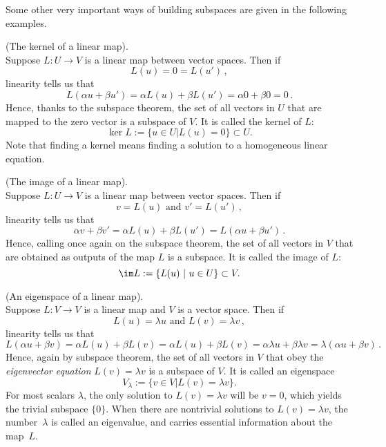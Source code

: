 Some other very important ways of building subspaces are given in the following examples.

\begin{example}
(The kernel of a linear map).\\[-2mm]

\noindent
Suppose $L:U\to V$ is a linear map between vector spaces. Then if
\[
L(u)=0=L(u')\, ,
\]
linearity tells us that
\[
L(\alpha u + \beta u') = \alpha L(u) + \beta L(u') =\alpha 0 + \beta 0 = 0\, .
\]
Hence, thanks to the subspace theorem,  the set of all vectors in $U$ that are mapped to the zero vector is a subspace of $V$.
It is called the kernel of $L$:
\[
\ker L:=\{u\in U| L(u) = 0\}\subset U.
\]
Note that finding a kernel means finding a solution to a homogeneous linear equation. 
\end{example}

\begin{example}
(The image of a linear map).\\[-2mm]

\noindent
Suppose $L:U\to V$ is a linear map between vector spaces. Then if
\[
v=L(u) \mbox{ and } v'=L(u')\, ,
\]
linearity tells us that
\[
\alpha v + \beta v' = \alpha L(u) + \beta L(u') =L(\alpha u +\beta u')\, .
\]
Hence, calling once again on the subspace theorem,  the set of all vectors in $V$ that are obtained as outputs of the
map $L$ is a subspace.
It is called the image of $L$:
\[
\im L:=\{L(u) \ |\  u\in U \}\subset V.
\]
\end{example}

\begin{example}
(An eigenspace of a linear map).\\[-2mm]

\noindent
Suppose $L:V\to V$ is a linear map and $V$ is a vector space. Then if
\[
L(u)=\lambda u \mbox{ and } L(v)=\lambda v\, ,
\]
linearity tells us that
\[
L(\alpha u + \beta v) = \alpha L(u) + \beta L(v) =\alpha L(u) + \beta L(v) =\alpha \lambda u  + \beta \lambda v = \lambda (\alpha u + \beta v)\, .
\]
Hence, again by subspace theorem, the set of all vectors in $V$ that
obey the {\itshape eigenvector equation} $L(v)=\lambda v$ is a subspace of $V$. 
It is called an eigenspace
\[
V_\lambda:=\{v\in V| L(v) = \lambda v\}.
\]
For most scalars $\lambda$, the only solution to $L(v) = \lambda v$ will be $v=0$, which yields the trivial subspace $\{0\}$.
When there are nontrivial solutions to $L(v)=\lambda v$, the number~$\lambda$ is called an eigenvalue, and carries
essential information about the map~$L$. 
\end{example}

